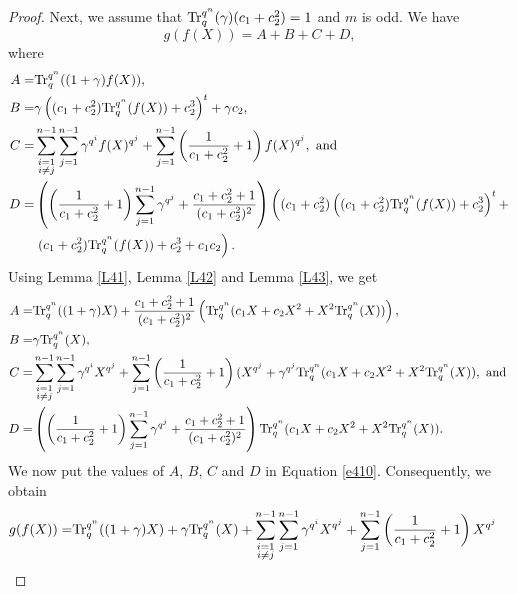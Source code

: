 \documentclass[11pt]{amsart}
\theoremstyle{plain}
\numberwithin{equation}{section}
\theoremstyle{definition}
\def\Tr{{\rm Tr}}
\begin{document}
\begin{proof}
  Next, we assume that $\Tr_{q}^{q^n}(\gamma)(c_1+c_2^2)=1$ and $m$ is odd. We have
  \begin{equation}\label{e410}
      g(f(X))=A+B+C+D,
  \end{equation} where
  \begin{equation*}
      \begin{split}
          A=&\Tr_{q}^{q^n}((1+\gamma)f(X)),
          \\B=&\gamma\left((c_1+c_2^2)\Tr_{q}^{q^n}(f(X))+c_2^3\right)^t+\gamma c_2,
          \\C=&\displaystyle\sum_{\substack{i=1\\ i\neq j}}^{n-1}\sum_{j=1}^{n-1}\gamma^{q^i}f(X)^{q^j}+\sum_{j=1}^{n-1}\left(\frac{1}{c_1+c_2^2}+1\right)f(X)^{q^j}, \text{ and }
          \\D=&\left(\left(\frac{1}{c_1+c_2^2}+1\right)\sum_{j=1}^{n-1}\gamma^{q^j}+\frac{c_1+c_2^2+1}{(c_1+c_2^2)^2}\right)\left((c_1+c_2^2)\left((c_1+c_2^2)\Tr_{q}^{q^n}(f(X))+c_2^3\right)^t+\right.\\&\left.(c_1+c_2^2)\Tr_{q}^{q^n}(f(X))+c_2^3+c_1c_2\right).
      \end{split}
  \end{equation*}
  Using Lemma \ref{L41}, Lemma \ref{L42} and Lemma \ref{L43}, we get
  \begin{equation*}
      \begin{split}
          A=&\Tr_{q}^{q^n}((1+\gamma)X)+\frac{c_1+c_2^2+1}{(c_1+c_2^2)^2}\left(\Tr_{q}^{q^n}(c_1X+c_2X^2+X^2\Tr_{q}^{q^n}(X))\right),
          \\B=& \gamma \Tr_{q}^{q^n}(X),
          \\C=&\displaystyle\sum_{\substack{i=1\\ i\neq j}}^{n-1}\sum_{j=1}^{n-1}\gamma^{q^i}X^{q^j}+\sum_{j=1}^{n-1}\left(\frac{1}{c_1+c_2^2}+1\right)(X^{q^j}+\gamma^{q^j}\Tr_{q}^{q^n}(c_1X+c_2X^2+X^2\Tr_{q}^{q^n}(X)),  \text{ and }
          \\D=&\left(\left(\frac{1}{c_1+c_2^2}+1\right)\sum_{j=1}^{n-1}\gamma^{q^j}+\frac{c_1+c_2^2+1}{(c_1+c_2^2)^2}\right)\Tr_{q}^{q^n}(c_1X+c_2X^2+X^2\Tr_{q}^{q^n}(X)).
      \end{split}
  \end{equation*}
  We now put the values of $A$, $B$, $C$ and $D$ in Equation \ref{e410}. Consequently, we obtain
  \begin{equation*}
      \begin{split}
          g(f(X))=&\Tr_{q}^{q^n}((1+\gamma)X)+\gamma \Tr_{q}^{q^n}(X)+\displaystyle\sum_{\substack{i=1\\ i\neq j}}^{n-1}\sum_{j=1}^{n-1}\gamma^{q^i}X^{q^j}+\sum_{j=1}^{n-1}\left(\frac{1}{c_1+c_2^2}+1\right)X^{q^j}

\end{split}
\end{equation*}
\end{proof}
\end{document}
